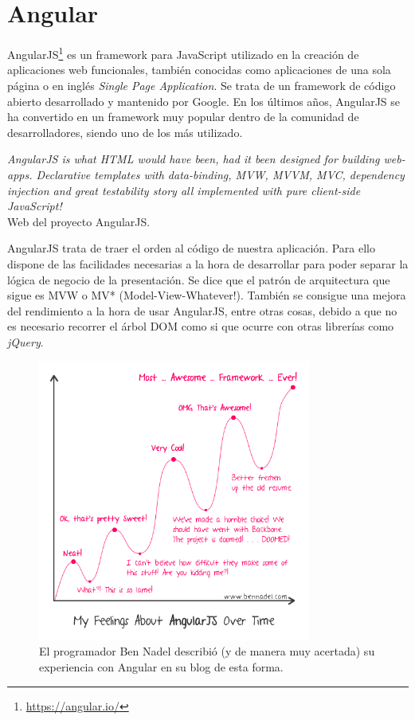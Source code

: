\section{Angular}\label{sec:angular}

AngularJS\footnote{\url{https://angular.io/}} es un framework para JavaScript utilizado en la creación de aplicaciones web funcionales, también conocidas como aplicaciones de una sola página o en inglés \emph{Single Page Application}. Se trata de un framework de código abierto desarrollado y mantenido por Google. En los últimos años, AngularJS se ha convertido en un framework muy popular dentro de la comunidad de desarrolladores, siendo uno de los más utilizado.

\begin{flushright}
\emph{AngularJS is what HTML would have been, had it been designed for building web-apps. Declarative templates with data-binding, MVW, MVVM, MVC, dependency injection and great testability story all implemented with pure client-side JavaScript!}\\
Web del proyecto AngularJS.
\end{flushright}

AngularJS trata de traer el orden al código de nuestra aplicación. Para ello dispone de las facilidades necesarias a la hora de desarrollar para poder separar la lógica de negocio de la presentación. Se dice que el patrón de arquitectura que sigue es MVW o MV* (Model-View-Whatever!). También se consigue una mejora del rendimiento a la hora de usar AngularJS, entre otras cosas, debido a que no es necesario recorrer el árbol DOM como si que ocurre con otras librerías como \emph{jQuery}.

\begin{figure}
\centering
  \includegraphics[width=0.8\textwidth]{Figures/ch1/angular/ben_nadel_experience_w_angular}
  \caption{El programador Ben Nadel describió (y de manera muy acertada) su experiencia con Angular en su blog de esta forma. \cite{AngBenNadel}}
\end{figure}


